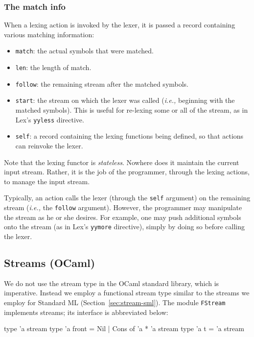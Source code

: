 \documentclass[10pt]{article}
\begin{document}
\begin{strictcode}
\subsubsection{The match info}
\label{sec:match-info}

When a lexing action is invoked by the lexer, it is passed a record
containing various matching information:

\begin{itemize}
\item
{\tt match}:
the actual symbols that were matched.

\item
{\tt len}:
the length of match.

\item
{\tt follow}:
the remaining stream after the matched symbols.

\item
{\tt start}:
the stream on which the lexer was called ({\em i.e.,} beginning with the
matched symbols).  This is useful for re-lexing some or all of the
stream, as in Lex's {\tt yyless} directive.

\item
{\tt self}:
a record containing the lexing functions being defined, so that
actions can reinvoke the lexer.
\end{itemize}

Note that the lexing functor is {\em stateless}.  Nowhere does it maintain
the current input stream.  Rather, it is the job of the programmer,
through the lexing actions, to manage the input stream.

Typically, an action calls the lexer (through the {\tt self} argument) on
the remaining stream ({\em i.e.,} the {\tt follow} argument).  However, the
programmer may manipulate the stream as he or she desires.  For
example, one may push additional symbols onto the stream (as in Lex's
{\tt yymore} directive), simply by doing so before calling the lexer.


\subsection{Streams (OCaml)}

We do not use the stream type in the OCaml standard library, which is
imperative.  Instead we employ a functional stream type similar to the
streams we employ for Standard ML (Section~\ref{sec:stream-sml}).  The
module {\tt FStream} implements streams; its interface is abbreviated
below:

\begin{code}
type 'a stream
type 'a front = Nil | Cons of 'a * 'a stream
type 'a t = 'a stream


\end{code}
\end{strictcode}
\end{document}
